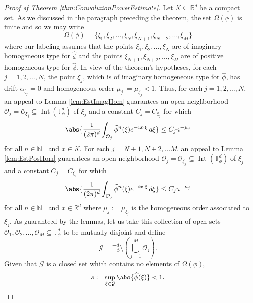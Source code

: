 \documentclass[11pt, letter]{book}
\newcommand\Interior{\operatorname{Int}}
\begin{document}
\begin{proof}[Proof of Theorem \ref{thm:ConvolutionPowerEstimate}]
Let $K\subseteq\mathbb{R}^d$ be a compact set. As we discussed in the paragraph preceding the theorem, the set $\Omega(\phi)$ is finite and so we may write
\begin{equation*}
    \Omega(\phi)=\{\xi_1,\xi_2,\dots,\xi_N,\xi_{N+1},\xi_{N+2},\dots,\xi_M\}
\end{equation*}
where our labeling assumes that the points $\xi_1,\xi_2,\dots,\xi_N$ are of imaginary homogeneous type for $\widehat{\phi}$ and the points $\xi_{N+1},\xi_{N+2},\dots,\xi_M$ are of positive homogeneous type for $\widehat{\phi}$. In view of the theorem's hypotheses, for each $j=1,2,\dots,N$, the point $\xi_j$, which is of imaginary homogeneous type for $\widehat{\phi}$, has drift $\alpha_{\xi_j}=0$ and homogeneous order $\mu_j:=\mu_{\xi_j}<1$. Thus, for each $j=1,2,\dots,N$, an appeal to Lemma \ref{lem:EstImagHom} guarantees an open neighborhood $\mathcal{O}_j=\mathcal{O}_{\xi_j}\subseteq\Interior(\mathbb{T}_\phi^d)$ of $\xi_j$ and a constant $C_j=C_{\xi_j}$ for which
\begin{equation}\label{eq:ConvolutionPowerEstimate1}
    \abs{\frac{1}{(2\pi)^d}\int_{\mathcal{O}_j}\widehat{\phi}^n(\xi)e^{-ix\cdot\xi}\,d\xi}\leq C_j n^{-\mu_j}
\end{equation}
for all $n\in\mathbb{N}_+$ and $x\in K$. For each $j=N+1,N+2,\dots M$, an appeal to Lemma \ref{lem:EstPosHom} guarantees an open neighborhood $\mathcal{O}_j=\mathcal{O}_{\xi_j}\subseteq\Interior(\mathbb{T}_\phi^d)$ of $\xi_j$ and a constant $C_j=C_{\xi_j}$ for which 
\begin{equation}\label{eq:ConvolutionPowerEstimate2}
        \abs{\frac{1}{(2\pi)^d}\int_{\mathcal{O}_j}\widehat{\phi}^n(\xi)e^{-ix\cdot\xi}\,d\xi}\leq C_jn^{-\mu_j}
\end{equation}
for all $n\in\mathbb{N}_+$ and $x\in\mathbb{R}^d$ where $\mu_j:=\mu_{\xi_j}$ is the homogeneous order associated to $\xi_j$. As guaranteed by the lemmas, let us take this collection of open sets $\mathcal{O}_1,\mathcal{O}_2,\dots,\mathcal{O}_M\subseteq\mathbb{T}_{\phi}^d$ to be mutually disjoint and define
\begin{equation}
    \mathcal{G}=\mathbb{T}_{\phi}^d\setminus\left(\bigcup_{j=1}^M \mathcal{O}_j\right).
\end{equation}
Given that $\mathcal{G}$ is a closed set which contains no elements of $\Omega(\phi)$,
\begin{equation*}
s:=\sup_{\xi\in\mathcal{G}}\abs{\widehat{\phi}(\xi)}<1.

\end{equation*}
\end{proof}
\end{document}
